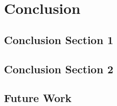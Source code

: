 %
\chapter{Conclusion}
\label{sec:conclusion}

\Blindtext[2][1]

\section{Conclusion Section 1}
\label{sec:conclusion:sec1}

\Blindtext[2][2]

\section{Conclusion Section 2}
\label{sec:conclusion:sec2}

\Blindtext[3][2]

\section{Future Work}
\label{sec:conclusion:future}

\Blindtext[2][2]
